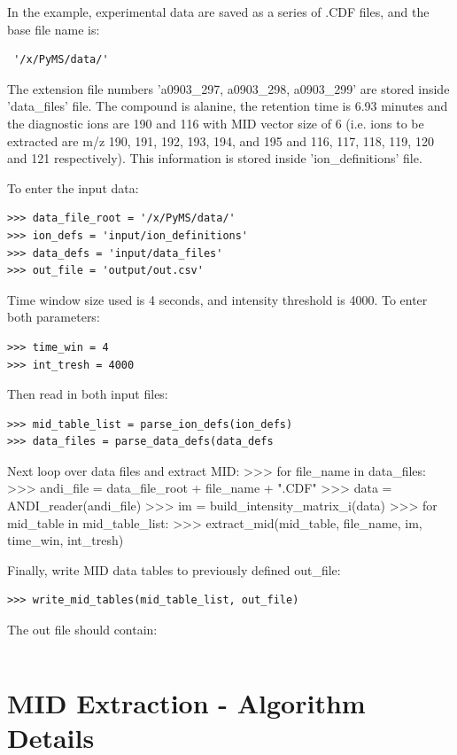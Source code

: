 In the example, experimental data are saved as a series of .CDF files, and the base 
file name is:
\begin{verbatim}
 '/x/PyMS/data/'
\end{verbatim}
The extension file numbers 'a0903_297, a0903_298, a0903_299' are stored inside 
'data_files' file. The compound is alanine, the retention time is 6.93 minutes 
and the diagnostic ions are 190 and 116 with MID vector size of 6 (i.e. ions to 
be extracted are m/z 190, 191, 192, 193, 194, and 195 and 116, 117, 118, 119, 
120 and 121 respectively). This information is stored inside 'ion_definitions' 
file.

To enter the input data:

\begin{verbatim}
>>> data_file_root = '/x/PyMS/data/'
>>> ion_defs = 'input/ion_definitions'
>>> data_defs = 'input/data_files'
>>> out_file = 'output/out.csv'
\end{verbatim}

Time window size used is 4 seconds, and intensity threshold is 4000. To enter 
both parameters:

\begin{verbatim} 
>>> time_win = 4 
>>> int_tresh = 4000 
\end{verbatim}

Then read in both input files:
\begin{verbatim}
>>> mid_table_list = parse_ion_defs(ion_defs)
>>> data_files = parse_data_defs(data_defs
\end{verbatim}

Next loop over data files and extract MID:
>>> for file_name in data_files:
>>>     andi_file = data_file_root + file_name + ".CDF"
>>>     data = ANDI_reader(andi_file)
>>>     im = build_intensity_matrix_i(data)
>>>     for mid_table in mid_table_list:
>>>         extract_mid(mid_table, file_name, im, time_win, int_tresh)

Finally, write MID data tables to previously defined out_file:
\begin{verbatim}
>>> write_mid_tables(mid_table_list, out_file)
\end{verbatim}

The out file should contain:

\begin{verbatim}

\end{verbatim}

\section
{MID Extraction - Algorithm Details}

